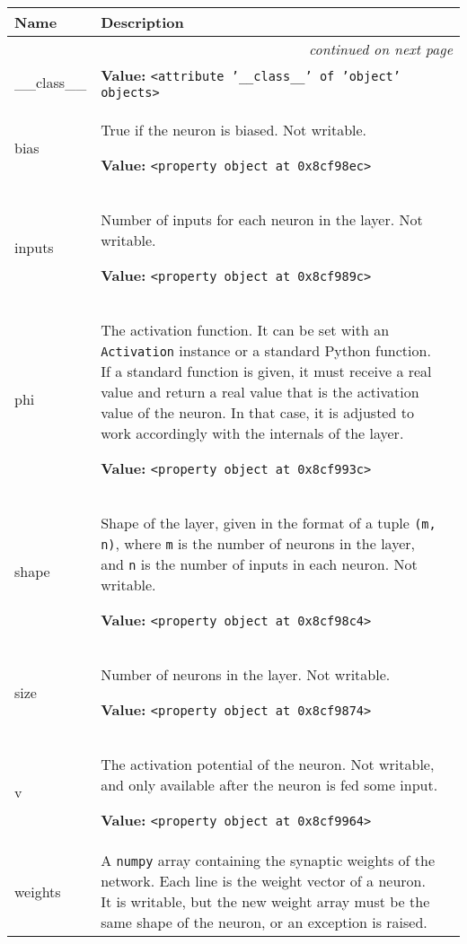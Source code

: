 \begin{longtable}{|p{}|p{}|l}
\cline{1-2}
\cline{1-2} \centering \textbf{Name} & \centering \textbf{Description}& \\
\cline{1-2}
\endhead\cline{1-2}\multicolumn{3}{r}{\small\textit{continued on next page}}\\\endfoot\cline{1-2}
\endlastfoot\raggedright \_\-\_\-c\-l\-a\-s\-s\-\_\-\_\- & \raggedright \textbf{Value:} 
{\tt {\textless}attribute '\_\_class\_\_' of 'object' objects{\textgreater}}&\\
\cline{1-2}
\raggedright b\-i\-a\-s\- & \raggedright True if the neuron is biased. Not writable.

\textbf{Value:} 
{\tt {\textless}property object at 0x8cf98ec{\textgreater}}&\\
\cline{1-2}
\raggedright i\-n\-p\-u\-t\-s\- & \raggedright Number of inputs for each neuron in the layer. Not writable.

\textbf{Value:} 
{\tt {\textless}property object at 0x8cf989c{\textgreater}}&\\
\cline{1-2}
\raggedright p\-h\-i\- & \raggedright The activation function. It can be set with an \texttt{Activation} instance or
a standard Python function. If a standard function is given, it must receive
a real value and return a real value that is the activation value of the
neuron. In that case, it is adjusted to work accordingly with the internals
of the layer.

\textbf{Value:} 
{\tt {\textless}property object at 0x8cf993c{\textgreater}}&\\
\cline{1-2}
\raggedright s\-h\-a\-p\-e\- & \raggedright Shape of the layer, given in the format of a tuple \texttt{(m, n)}, where
\texttt{m} is the number of neurons in the layer, and \texttt{n} is the number of
inputs in each neuron. Not writable.

\textbf{Value:} 
{\tt {\textless}property object at 0x8cf98c4{\textgreater}}&\\
\cline{1-2}
\raggedright s\-i\-z\-e\- & \raggedright Number of neurons in the layer. Not writable.

\textbf{Value:} 
{\tt {\textless}property object at 0x8cf9874{\textgreater}}&\\
\cline{1-2}
\raggedright v\- & \raggedright The activation potential of the neuron. Not writable, and only available
after the neuron is fed some input.

\textbf{Value:} 
{\tt {\textless}property object at 0x8cf9964{\textgreater}}&\\
\cline{1-2}
\raggedright w\-e\-i\-g\-h\-t\-s\- & \raggedright A \texttt{numpy} array containing the synaptic weights of the network. Each
line is the weight vector of a neuron. It is writable, but the new weight
array must be the same shape of the neuron, or an exception is raised.


\end{longtable}
